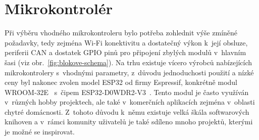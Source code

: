 \section{Mikrokontrolér}
Při výběru vhodného mikrokontroleru bylo potřeba zohlednit výše zmíněné požadavky, tedy zejména Wi-Fi konektivitu a dostatečný výkon k~její obsluze, periferii CAN a dostatek GPIO pinů pro připojení zbylých modulů v~hlavním šasi (viz obr.~\ref{fig:blokove-schema}). Na trhu existuje vícero výrobců nabízejících mikrokontrolery s~vhodnými parametry, z~důvodu jednoduchosti použití a nízké ceny byl nakonec zvolen model ESP32 od firmy Espressif, konkrétně modul WROOM-32E~\cite{esp32-wroom-32e-datasheet} s~čipem ESP32-D0WDR2-V3~\cite{esp32-datasheet}. Tento modul je často využíván v~různých hobby projektech, ale také v~komerčních aplikacích zejména v~oblasti chytré domácnosti. Z~tohoto důvodu k~němu existuje velká škála softwarových knihoven a v~rámci komunity uživatelů je také sdíleno mnoho projektů, kterými je možné se inspirovat.